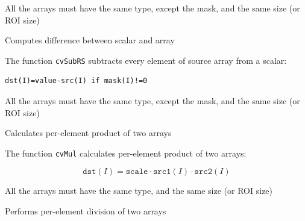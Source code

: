 All the arrays must have the same type, except the mask, and the same size (or ROI size)


\label{SubRS}

Computes difference between scalar and array


\begin{description}
\end{description}


The function \texttt{cvSubRS} subtracts every element of source array from a scalar:

\begin{lstlisting}
dst(I)=value-src(I) if mask(I)!=0
\end{lstlisting}

All the arrays must have the same type, except the mask, and the same size (or ROI size)

\label{Mul}

Calculates per-element product of two arrays


\begin{description}
\end{description}


The function \texttt{cvMul} calculates per-element product of two arrays:

\[
\texttt{dst}(I)=\texttt{scale} \cdot \texttt{src1}(I) \cdot \texttt{src2}(I)
\]

All the arrays must have the same type, and the same size (or ROI size)

\label{Div}

Performs per-element division of two arrays



